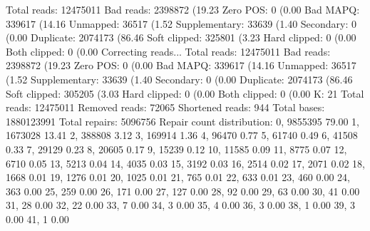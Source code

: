Total reads:         12475011
Bad reads:           2398872 (19.23 %
Zero POS:            0 (0.00 %
Bad MAPQ:            339617 (14.16 %
Unmapped:            36517 (1.52 %
Supplementary:       33639 (1.40 %
Secondary:           0 (0.00 %
Duplicate:           2074173 (86.46 %
Soft clipped:        325801 (3.23 %
Hard clipped:        0 (0.00 %
Both clipped:        0 (0.00 %
Correcting reads...
Total reads:         12475011
Bad reads:           2398872 (19.23 %
Zero POS:            0 (0.00 %
Bad MAPQ:            339617 (14.16 %
Unmapped:            36517 (1.52 %
Supplementary:       33639 (1.40 %
Secondary:           0 (0.00 %
Duplicate:           2074173 (86.46 %
Soft clipped:        305205 (3.03 %
Hard clipped:        0 (0.00 %
Both clipped:        0 (0.00 %
K:                  21
Total reads:        12475011
Removed reads:      72065
Shortened reads:    944
Total bases:        1880123991
Total repairs:      5096756
Repair count distribution:
0,      9855395 79.00 %
1,      1673028 13.41 %
2,      388808  3.12 %
3,      169914  1.36 %
4,      96470   0.77 %
5,      61740   0.49 %
6,      41508   0.33 %
7,      29129   0.23 %
8,      20605   0.17 %
9,      15239   0.12 %
10,     11585   0.09 %
11,     8775    0.07 %
12,     6710    0.05 %
13,     5213    0.04 %
14,     4035    0.03 %
15,     3192    0.03 %
16,     2514    0.02 %
17,     2071    0.02 %
18,     1668    0.01 %
19,     1276    0.01 %
20,     1025    0.01 %
21,     765     0.01 %
22,     633     0.01 %
23,     460     0.00 %
24,     363     0.00 %
25,     259     0.00 %
26,     171     0.00 %
27,     127     0.00 %
28,     92      0.00 %
29,     63      0.00 %
30,     41      0.00 %
31,     28      0.00 %
32,     22      0.00 %
33,     7       0.00 %
34,     3       0.00 %
35,     4       0.00 %
36,     3       0.00 %
38,     1       0.00 %
39,     3       0.00 %
41,     1       0.00 %

